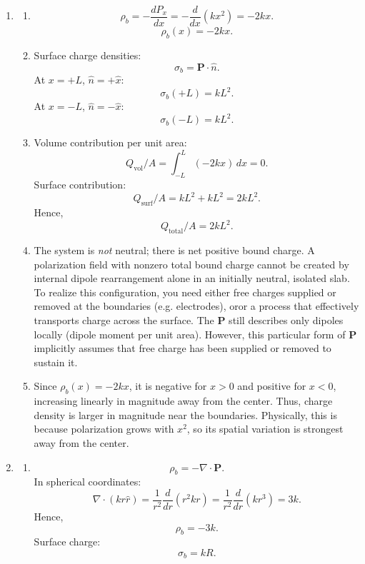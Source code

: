 \documentclass[12pt]{article}
\begin{document}
\begin{enumerate}
\item 

\begin{enumerate}
    \item
    \[
    \rho_b = -\frac{dP_x}{dx} = -\frac{d}{dx}(kx^2) = -2kx.
    \]
    \[
    \boxed{\rho_b(x) = -2kx.}
    \]

    \item Surface charge densities:
    \[
    \sigma_b = \mathbf{P}\cdot \hat{n}.
    \]
    At $x=+L$, $\hat{n}=+\hat{x}$:
    \[
    \boxed{\sigma_b(+L) = kL^2.}
    \]
    At $x=-L$, $\hat{n}=-\hat{x}$:
    \[
    \boxed{\sigma_b(-L) = kL^2.}
    \]

    \item Volume contribution per unit area:
    \[
    Q_{\text{vol}}/A = \int_{-L}^{L} (-2kx)\,dx = 0.
    \]
    Surface contribution:
    \[
    Q_{\text{surf}}/A = kL^2 + kL^2 = 2kL^2.
    \]
    Hence,
    \[
    \boxed{Q_{\text{total}}/A = 2kL^2.}
    \]

    \item The system is \emph{not} neutral; there is net positive bound charge. A polarization field with nonzero total bound charge cannot be created by internal dipole rearrangement alone in an initially neutral, isolated slab. To realize this configuration, you need either free charges supplied or removed at the boundaries (e.g. electrodes), oror a process that effectively transports charge across the surface. The $\mathbf{P}$ still describes only dipoles locally (dipole moment per unit area). However, this particular form of $\mathbf{P}$ implicitly assumes that free charge has been supplied or removed to sustain it.

    \item Since $\rho_b(x) = -2kx$, it is negative for $x>0$ and positive for $x<0$, increasing linearly in magnitude away from the center. Thus, charge density is larger in magnitude near the boundaries. Physically, this is because polarization grows with $x^2$, so its spatial variation is strongest away from the center.
\end{enumerate}

\item 

\begin{enumerate}
    \item
    \[
    \rho_b = -\nabla \cdot \mathbf{P}.
    \]
    In spherical coordinates:
    \[
    \nabla \cdot (kr\hat{r}) = \frac{1}{r^2}\frac{d}{dr}(r^2 kr) = \frac{1}{r^2}\frac{d}{dr}(kr^3) = 3k.
    \]
    Hence,
    \[
    \boxed{\rho_b = -3k.}
    \]
    Surface charge:
    \[
    \boxed{\sigma_b = kR.}
    \]


\end{enumerate}
\end{enumerate}
\end{document}
